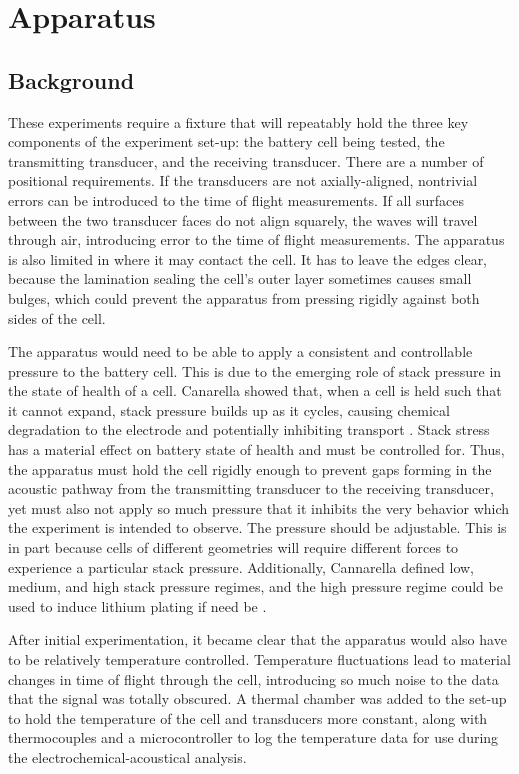 \chapter{Apparatus}

\section{Background}
These experiments require a fixture that will repeatably hold the three key components of the experiment set-up: the battery cell being tested, the transmitting transducer, and the receiving transducer. 
There are a number of positional requirements. 
If the transducers are not axially-aligned, nontrivial errors can be introduced to the time of flight measurements.
If all surfaces between the two transducer faces do not align squarely, the waves will travel through air, introducing error to the time of flight measurements. 
The apparatus is also limited in where it may contact the cell. It has to leave the edges clear, because the lamination sealing the cell's outer layer sometimes causes small bulges, which could prevent the apparatus from pressing rigidly against both sides of the cell.

The apparatus would need to be able to apply a consistent and controllable pressure to the battery cell. 
This is due to the emerging role of stack pressure in the state of health of a cell. 
Canarella showed that, when a cell is held such that it cannot expand, stack pressure builds up as it cycles, causing chemical degradation to the electrode and potentially inhibiting transport \cite{STACK-STRESS}. Stack stress has a material effect on battery state of health and must be controlled for.
Thus, the apparatus must hold the cell rigidly enough to prevent gaps forming in the acoustic pathway from the transmitting transducer to the receiving transducer, yet must also not apply so much pressure that it inhibits the very behavior which the experiment is intended to observe. 
The pressure should be adjustable. This is in part because cells of different geometries will require different forces to experience a particular stack pressure. 
Additionally, Cannarella defined low, medium, and high stack pressure regimes, and the high pressure regime could be used to induce lithium plating if need be \cite{STACK-STRESS}.

After initial experimentation, it became clear that the apparatus would also have to be relatively temperature controlled. 
Temperature fluctuations lead to material changes in time of flight through the cell, introducing so much noise to the data that the signal was totally obscured.
A thermal chamber was added to the set-up to hold the temperature of the cell and transducers more constant, along with thermocouples and a microcontroller to log the temperature data for use during the electrochemical-acoustical analysis.

